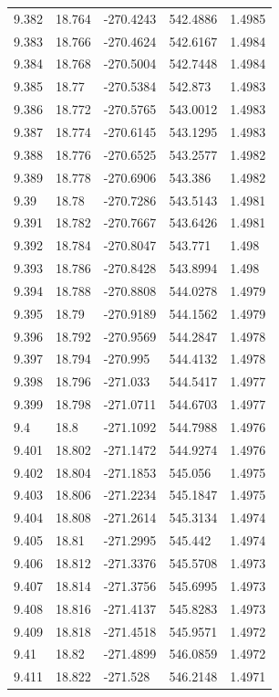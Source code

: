 \begin{tabular}{lllll}
9.382 & 18.764 & -270.4243 & 542.4886 & 1.4985 \\
9.383 & 18.766 & -270.4624 & 542.6167 & 1.4984 \\
9.384 & 18.768 & -270.5004 & 542.7448 & 1.4984 \\
9.385 & 18.77 & -270.5384 & 542.873 & 1.4983 \\
9.386 & 18.772 & -270.5765 & 543.0012 & 1.4983 \\
9.387 & 18.774 & -270.6145 & 543.1295 & 1.4983 \\
9.388 & 18.776 & -270.6525 & 543.2577 & 1.4982 \\
9.389 & 18.778 & -270.6906 & 543.386 & 1.4982 \\
9.39 & 18.78 & -270.7286 & 543.5143 & 1.4981 \\
9.391 & 18.782 & -270.7667 & 543.6426 & 1.4981 \\
9.392 & 18.784 & -270.8047 & 543.771 & 1.498 \\
9.393 & 18.786 & -270.8428 & 543.8994 & 1.498 \\
9.394 & 18.788 & -270.8808 & 544.0278 & 1.4979 \\
9.395 & 18.79 & -270.9189 & 544.1562 & 1.4979 \\
9.396 & 18.792 & -270.9569 & 544.2847 & 1.4978 \\
9.397 & 18.794 & -270.995 & 544.4132 & 1.4978 \\
9.398 & 18.796 & -271.033 & 544.5417 & 1.4977 \\
9.399 & 18.798 & -271.0711 & 544.6703 & 1.4977 \\
9.4 & 18.8 & -271.1092 & 544.7988 & 1.4976 \\
9.401 & 18.802 & -271.1472 & 544.9274 & 1.4976 \\
9.402 & 18.804 & -271.1853 & 545.056 & 1.4975 \\
9.403 & 18.806 & -271.2234 & 545.1847 & 1.4975 \\
9.404 & 18.808 & -271.2614 & 545.3134 & 1.4974 \\
9.405 & 18.81 & -271.2995 & 545.442 & 1.4974 \\
9.406 & 18.812 & -271.3376 & 545.5708 & 1.4973 \\
9.407 & 18.814 & -271.3756 & 545.6995 & 1.4973 \\
9.408 & 18.816 & -271.4137 & 545.8283 & 1.4973 \\
9.409 & 18.818 & -271.4518 & 545.9571 & 1.4972 \\
9.41 & 18.82 & -271.4899 & 546.0859 & 1.4972 \\
9.411 & 18.822 & -271.528 & 546.2148 & 1.4971 \\

\end{tabular}
